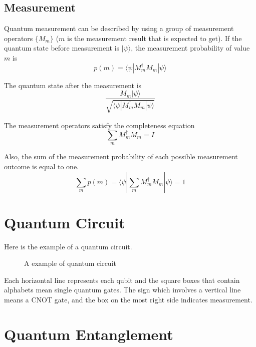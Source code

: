 \subsection{Measurement}
Quantum measurement can be described by using a group of measurement operators $\{M_m\}$
($m$ is the measurement result that is expected to get).
 If the quantum state before measurement is $|\psi\rangle$, the measurement probability of value $m$ is 
 $$p(m) = \langle \psi|M^{\dagger}_m M_m|\psi\rangle$$

 The quantum state after the measurement is 
 $$\frac{M_m|\psi\rangle}{\sqrt{\langle \psi|M^{\dagger}_m M_m|\psi\rangle}}$$

The measurement operators satisfy the completeness equation
$$\sum_{m} M^{\dagger}_m M_m = I$$

Also, the sum of the measurement probability of each possible measurement outcome is equal to one.
$$\sum_{m} p(m) = \langle \psi|\sum_{m} M^{\dagger}_m M_m|\psi\rangle = 1$$


\section{Quantum Circuit}
Here is the example of a quantum circuit.

\begin{figure}[ht]
  \begin{center}
\caption{A example of quantum circuit}
\end{center}
\end{figure}

Each horizontal line represents each qubit and the square boxes that contain alphabets mean single quantum gates.  The sign which involves a vertical line means a CNOT gate, and the box on the most right side indicates measurement. 

\section{Quantum Entanglement}

